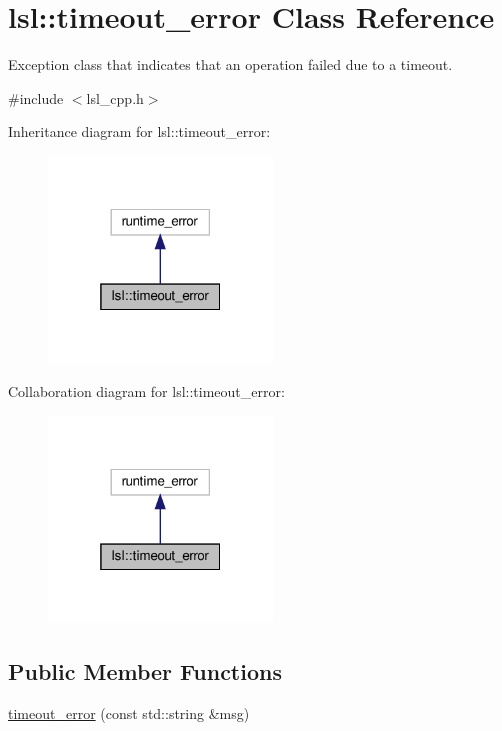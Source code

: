 \hypertarget{classlsl_1_1timeout__error}{}\section{lsl\+:\+:timeout\+\_\+error Class Reference}
\label{classlsl_1_1timeout__error}


Exception class that indicates that an operation failed due to a timeout.  




{\ttfamily \#include $<$lsl\+\_\+cpp.\+h$>$}



Inheritance diagram for lsl\+:\+:timeout\+\_\+error\+:\nopagebreak
\begin{figure}[H]
\begin{center}
\leavevmode
\includegraphics[width=169pt]{d9/d05/classlsl_1_1timeout__error__inherit__graph}
\end{center}
\end{figure}


Collaboration diagram for lsl\+:\+:timeout\+\_\+error\+:\nopagebreak
\begin{figure}[H]
\begin{center}
\leavevmode
\includegraphics[width=169pt]{d4/d2c/classlsl_1_1timeout__error__coll__graph}
\end{center}
\end{figure}
\subsection*{Public Member Functions}
\begin{DoxyCompactItemize}
\item 
\hyperlink{classlsl_1_1timeout__error_afbc3b7c957fe3da4021aff3c30e6192f}{timeout\+\_\+error} (const std\+::string \&msg)
\end{DoxyCompactItemize}


